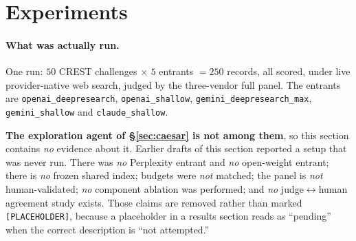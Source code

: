 \section{Experiments}
\label{sec:experiments}

\paragraph{What was actually run.} One run: $50$ CREST challenges $\times$ $5$ entrants $=250$
records, all scored, under live provider-native web search, judged by the three-vendor full panel.
The entrants are \texttt{openai\_deepresearch}, \texttt{openai\_shallow},
\texttt{gemini\_deepresearch\_max}, \texttt{gemini\_shallow} and \texttt{claude\_shallow}.

\textbf{The exploration agent of \S\ref{sec:caesar} is not among them}, so this section contains
\emph{no} evidence about it. Earlier drafts of this section reported a setup that was never run.
There was \emph{no} Perplexity entrant and \emph{no} open-weight entrant; there is \emph{no} frozen
shared index; budgets were \emph{not} matched; the panel is \emph{not} human-validated; \emph{no}
component ablation was performed; and \emph{no} judge$\leftrightarrow$human agreement study exists.
Those claims are removed rather than marked \texttt{[PLACEHOLDER]}, because a
placeholder in a results section reads as ``pending'' when the correct description is ``not
attempted.''


